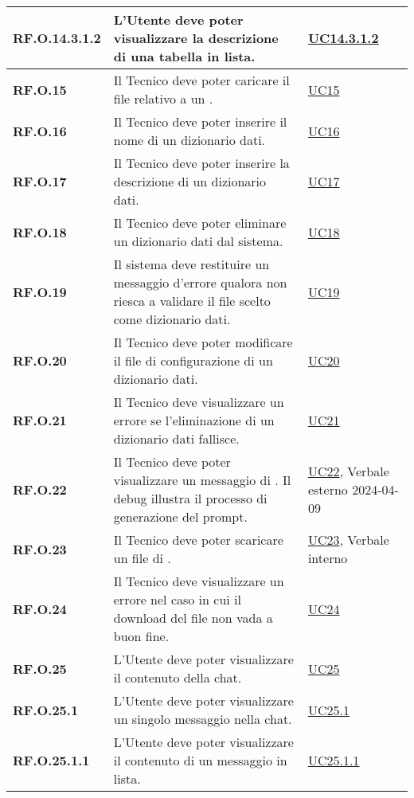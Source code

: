 \begin{adjustwidth}{-0.5cm}{-0.5cm}
\begin{longtable}{|P{3cm}|P{6,5cm}|>{\arraybackslash}P{4cm}|}
    \hline
    \textbf{RF.O.14.3.1.2} & L'Utente deve poter visualizzare la descrizione di una tabella in lista. & \hyperref[UC14point3point1point2]{UC14.3.1.2}\\
    \hline
    \textbf{RF.O.15} & Il Tecnico deve poter caricare il file relativo a un . & \hyperref[UC15]{UC15}\\
    \hline
    \textbf{RF.O.16} & Il Tecnico deve poter inserire il nome di un dizionario dati. & \hyperref[UC16]{UC16}\\
    \hline
    \textbf{RF.O.17} & Il Tecnico deve poter inserire la descrizione di un dizionario dati. & \hyperref[UC17]{UC17}\\
    \hline
    \textbf{RF.O.18} & Il Tecnico deve poter eliminare un dizionario dati dal sistema. & \hyperref[UC18]{UC18}\\
    \hline
    \textbf{RF.O.19} & Il sistema deve restituire un messaggio d'errore qualora non riesca a validare il file scelto come dizionario dati. & \hyperref[UC19]{UC19} \\
    \hline 
    \textbf{RF.O.20} & Il Tecnico deve poter modificare il file di configurazione di un dizionario dati. & \hyperref[UC20]{UC20} \\
    \hline
    \textbf{RF.O.21} & Il Tecnico deve visualizzare un errore se l'eliminazione di un dizionario dati fallisce. & \hyperref[21]{UC21}\\
    \hline
    \textbf{RF.O.22} & Il Tecnico deve poter visualizzare un messaggio di . Il debug illustra il processo di generazione del prompt. & \hyperref[22]{UC22}, Verbale esterno 2024-04-09 \\
    \hline
    \textbf{RF.O.23} & Il Tecnico deve poter scaricare un file di . & \hyperref[23]{UC23}, Verbale interno\\
    \hline
    \textbf{RF.O.24} & Il Tecnico deve visualizzare un errore nel caso in cui il download del file non vada a buon fine. &  \hyperref[UC24]{UC24}\\
    \hline
    \textbf{RF.O.25} & L'Utente deve poter visualizzare il contenuto della chat. &  \hyperref[UC25]{UC25}\\
    \hline
    \textbf{RF.O.25.1} & L'Utente deve poter visualizzare un singolo messaggio nella chat. &  \hyperref[UC25point1]{UC25.1}\\
    \hline
    \textbf{RF.O.25.1.1} & L'Utente deve poter visualizzare il contenuto di un messaggio in lista. & \hyperref[UC25point1point1]{UC25.1.1}\\

\end{longtable}
\end{adjustwidth}
